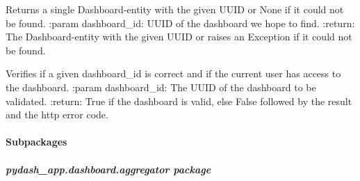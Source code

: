 \documentclass[letterpaper,10pt,english]{sphinxmanual}
\begin{document}

\begin{fulllineitems}
\label{\detokenize{pydash_app.dashboard:pydash_app.dashboard.find}}
Returns a single Dashboard-entity with the given UUID or None if it could not be found.
:param dashboard\_id: UUID of the dashboard we hope to find.
:return: The Dashboard-entity with the given UUID or raises an Exception if it could not be found.

\end{fulllineitems}


\begin{fulllineitems}
\label{\detokenize{pydash_app.dashboard:pydash_app.dashboard.find_verified_dashboard}}
Verifies if a given dashboard\_id is correct and if the current user has access
to the dashboard.
:param dashboard\_id: The UUID of the dashboard to be validated.
:return: True if the dashboard is valid, else False followed by the result and
the http error code.

\end{fulllineitems}


\begin{fulllineitems}
\label{\detokenize{pydash_app.dashboard:pydash_app.dashboard.remove_from_repository}}
\end{fulllineitems}



\paragraph{Subpackages}
\label{\detokenize{pydash_app.dashboard:subpackages}}

\subparagraph{pydash\_app.dashboard.aggregator package}
\label{\detokenize{pydash_app.dashboard.aggregator:module-pydash_app.dashboard.aggregator}}\label{\detokenize{pydash_app.dashboard.aggregator:pydash-app-dashboard-aggregator-package}}\label{\detokenize{pydash_app.dashboard.aggregator::doc}}
\end{document}
